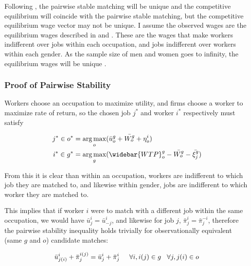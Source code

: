 \documentclass[12pt]{article}
\DeclareMathOperator*{\argmax}{arg\,max}
\begin{document}

Following , the pairwise stable matching will be unique and the competitive equilibrium will coincide with the pairwise stable matching, but the competitive equilibrium wage vector may not be unique. I assume the observed wages are the equilibrium wages described in  and . These are the wages that make workers indifferent over jobs within each occupation, and jobs indifferent over workers within each gender. As the sample size of men and women goes to infinity, the equilibrium wages will be unique \cite{Salanie2013a}.

\subsubsection{Proof of Pairwise Stability}\label{sec.Stability}

Workers choose an occupation to maximize utility, and firms choose a worker to maximize rate of return, so the chosen job $j^*$ and worker $i^*$ respectively must satisfy

\begin{align*}
j^* \in o^* &= \argmax_o ( \bar{u}^{g}_o + \bar{W^g_o}   + \eta^i_o ) \\
i^* \in g^* &= \argmax_g (\widebar{WTP}^g_o -  \bar{W^g_o} - \bar{\xi^g_j})
\end{align*}

From this it is clear than within an occupation, workers are indifferent to which job they are matched to, and likewise within gender, jobs are indifferent to which worker they are matched to.

This implies that if worker $i$ were to match with a different job within the same occupation, we would have $\bar{u}^{i}_j =\bar{u}^{i}_{-j}$, and likewise for job $j$, $\bar{\pi}^{i}_j = \bar{\pi}^{-i}_j $, therefore the pairwise stability inequality holds trivially for observationally equivalent (same $g$ and $o$) candidate matches:

$$\bar{u}^{i}_{j(i)}+ \bar{\pi}^{i(j)}_j = \bar{u}^{i}_{j} + \bar{\pi}^{i}_j \hspace{5mm} \forall i,i(j) \in g \hspace{3mm} \forall j,j(i) \in o$$
\end{document}
